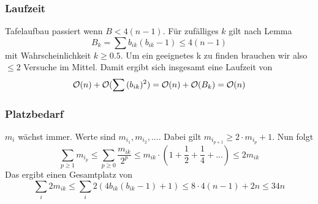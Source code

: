
                    
                    
                \subsubsection{Laufzeit}        
                    Tafelaufbau passiert wenn $B < 4(n-1)$. Für zufälliges $k$ gilt nach Lemma
                    $$
                        B_k = \sum{b_{ik}(b_{ik}-1)} \leq 4(n-1)
                    $$
                    mit Wahrscheinlichkeit $k \geq 0.5$. Um ein geeignetes k zu finden brauchen wir also $\leq 2$ Versuche im Mittel. Damit ergibt sich insgesamt eine Laufzeit von
                    $$
                        \mathcal{O}(n) + \mathcal{O}(\sum{(b_{ik})^2}) = \mathcal{O}(n) + \mathcal{O}(B_k) = \mathcal{O}(n)
                    $$
                    
                \subsubsection{Platzbedarf}
                    $m_i$ wächst immer. Werte sind $m_{i_1},m_{i_2},...$. Dabei gilt $m_{i_{p+1}} \geq 2 \cdot m_{i_p} + 1$. Nun folgt
                    $$
                        \sum_{p \geq 1}{m_{i_p}} \leq \sum_{p \geq 0}{\frac{m_{ik}}{2^p}} \leq m_{ik}\cdot \left(1+\frac{1}{2}+\frac{1}{4}+...\right) \leq 2m_{ik}
                    $$
                    Das ergibt einen Gesamtplatz von
                    $$
                        \sum_{i}{2m_{ik}} \leq \sum_{i}{2(4b_{ik}(b_{ik}-1)+1)} \leq 8 \cdot 4(n-1) + 2n
 \leq 34n
                    $$
                    
